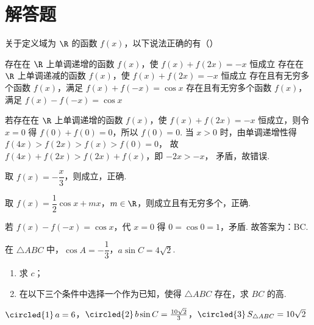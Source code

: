 \section{解答题}

\begin{problem}
关于定义域为 \(\R\) 的函数 \(f(x)\)，以下说法正确的有（\quad）

\choices
    {存在在 \(\R\) 上单调递增的函数 \(f(x)\)，使 \(f(x)+f(2x)=-x\) 恒成立}
    {存在在 \(\R\) 上单调递减的函数 \(f(x)\)，使 \(f(x)+f(2x)=-x\) 恒成立}
    {存在且有无穷多个函数 \(f(x)\)，满足 \(f(x)+f(-x)=\cos x\)}
    {存在且有无穷多个函数 \(f(x)\)，满足 \(f(x)-f(-x)=\cos x\)}
\end{problem}

\begin{solution}
若存在在 \(\R\) 上单调递增的函数 \(f(x)\)，使 \(f(x)+f(2x)=-x\) 恒成立，则令 \(x=0\) 得 \(f(0)+f(0)=0\)，所以 \(f(0)=0\).
当 \(x>0\) 时，由单调递增性得
\(
f(4x)>f(2x)>f(x)>f(0)=0
\)，
故 \(f(4x)+f(2x)>f(2x)+f(x)\)，即 \(-2x>-x\)，
矛盾，故错误.

取 \(f(x)=-\dfrac{x}{3}\)，则成立，正确.

取 \(f(x)=\dfrac{1}{2}\cos x+mx\)，\(m\in\R\)，则成立且有无穷多个，正确.

若 \(f(x)-f(-x)=\cos x\)，代 \(x=0\) 得 \(0=\cos 0=1\)，矛盾. 故答案为：BC.
\end{solution}

\begin{problem}
在 \(\triangle ABC\) 中，\(\cos A=-\dfrac13\)，\(a\sin C=4\sqrt2\).

\begin{enumerate}
\item 求 \(c\)；

\item 在以下三个条件中选择一个作为已知，使得 \(\triangle ABC\) 存在，求 \(BC\) 的高.
\end{enumerate}

\(\text{\circled{1}} \, a=6\)，\(\text{\circled{2}} \, b\sin C= \frac{10\sqrt2}{3}\)，\(\text{\circled{3}} \, S_{\triangle ABC}=10\sqrt2\)
\end{problem}

